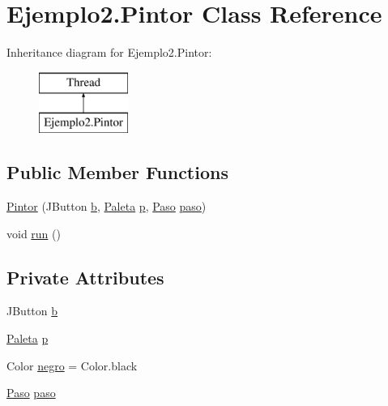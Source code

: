 \hypertarget{class_ejemplo2_1_1_pintor}{}\section{Ejemplo2.\+Pintor Class Reference}
\label{class_ejemplo2_1_1_pintor}
Inheritance diagram for Ejemplo2.\+Pintor\+:\begin{figure}[H]
\begin{center}
\leavevmode
\includegraphics[height=2.000000cm]{class_ejemplo2_1_1_pintor}
\end{center}
\end{figure}
\subsection*{Public Member Functions}
\begin{DoxyCompactItemize}
\item 
\mbox{\hyperlink{class_ejemplo2_1_1_pintor_a2b7757077832db106287bdd5cd27f89f}{Pintor}} (J\+Button \mbox{\hyperlink{class_ejemplo2_1_1_pintor_a6021262faf6f2f448fae53f631925af4}{b}}, \mbox{\hyperlink{class_ejemplo2_1_1_paleta}{Paleta}} \mbox{\hyperlink{class_ejemplo2_1_1_pintor_af9c943ecf491a9a812b1df951af13bf3}{p}}, \mbox{\hyperlink{class_ejemplo2_1_1_paso}{Paso}} \mbox{\hyperlink{class_ejemplo2_1_1_pintor_aa876f4590a419d58d81a29fcbf2a7529}{paso}})
\item 
void \mbox{\hyperlink{class_ejemplo2_1_1_pintor_a9d8a7b2851801f1613795f4848be48b3}{run}} ()
\end{DoxyCompactItemize}
\subsection*{Private Attributes}
\begin{DoxyCompactItemize}
\item 
J\+Button \mbox{\hyperlink{class_ejemplo2_1_1_pintor_a6021262faf6f2f448fae53f631925af4}{b}}
\item 
\mbox{\hyperlink{class_ejemplo2_1_1_paleta}{Paleta}} \mbox{\hyperlink{class_ejemplo2_1_1_pintor_af9c943ecf491a9a812b1df951af13bf3}{p}}
\item 
Color \mbox{\hyperlink{class_ejemplo2_1_1_pintor_a57bbfcbb65b0411c016704b96e9206d2}{negro}} = Color.\+black
\item 
\mbox{\hyperlink{class_ejemplo2_1_1_paso}{Paso}} \mbox{\hyperlink{class_ejemplo2_1_1_pintor_aa876f4590a419d58d81a29fcbf2a7529}{paso}}
\end{DoxyCompactItemize}


